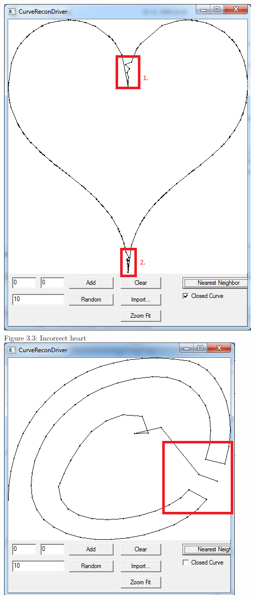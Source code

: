         \begin{center}
        \includegraphics[scale = 0.45]{1NearestNeighbor/nnHeartgraph.png}\\
        \label{fig:nn_incorrectheart}
        Figure 3.3: Incorrect heart
        \includegraphics[scale = 0.5]{1NearestNeighbor/nnSpiralgraph.png}\\

\end{center}
